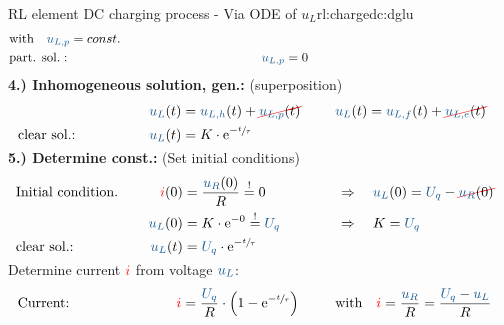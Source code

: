 {\begin{expl}{RL element DC charging process - Via ODE of $u_L$}{rl:chargedc:dglu}
\begin{align*}
                &\text{with}\quad \ecv{u_{L,p}} = const.  \\
        &\text{part. sol.}:&&&
            \ecv{u_{L,p}} &= 0
            \\[-15pt]&\hphantom{R1ooooooo}&&&\hphantom{L3oooooooooooooooooooo}&\hphantom{R3ooo}&&&&\hphantom{R5oooooooooooooooooooooo}\nonumber%
        \end{align*}%
    \textbf{4.) Inhomogeneous solution, gen.:} (superposition)%
    \begin{align*}%
        &&&&
            \ecv{u_L}(t) &= \ecv{u_{L,h}}(t) + \redcancel{\ecv{u_{L,p}}(t)} &&&
            &\ecv{u_L}(t)= \ecv{u_{L,f}}(t) + \redcancel{\ecv{u_{L,e}}(t)}  \\
        &\text{clear sol.:}&&&
            \ecv{u_L}(t) &= K \cdot \mathrm{e}^{-\sfrac{t}{\tau}}
        \\[-15pt]&\hphantom{R1oooooooooooo}&&&\hphantom{L3ooo}&\hphantom{R3oooooooooooooooo}&&&&\hphantom{R5oooooooooooooooooooooo}\nonumber%
    \end{align*}%
    \textbf{5.) Determine const.:} (Set initial conditions)%
    \begin{align*}%
        &\text{Initial condition.}&&&
            \eci{i}(0) &= \frac{\ecv{u_R}(0)}{R} \overset{!}{=} 0 &&&
            &\Rightarrow\quad \ecv{u_L}(0) = \ecv{U_q} - \redcancel{\ecv{u_R}(0)}\\
        &&&&
            \ecv{u_L}(0) &= K \cdot \mathrm{e}^{-0} \overset{!}{=} \ecv{U_q} &&&
            &\Rightarrow\quad K = \ecv{U_q}\\
        &\text{clear sol.:}&&&
            \ecv{u_L}(t) &= \ecv{U_q} \cdot \mathrm{e}^{-\sfrac{t}{\tau}}
        \\[-15pt]&\hphantom{R1oooooooooooo}&&&\hphantom{L3ooo}&\hphantom{R3oooooooooooooooo}&&&&\hphantom{R5oooooooooooooooooooooo}\nonumber%
        \end{align*}%
    Determine current ${\color{red}i}$ from voltage $\ecv{u_L}$:%
    \begin{align*}%
        &\text{Current:}&&&
            \eci{i} &= \frac{\ecv{U_q}}{R} \cdot \left( 1 - \mathrm{e}^{-\sfrac{t}{\tau}} \right) &&&
            &\text{with}\quad \eci{i} = \frac{\ecv{u_R}}{R} = \frac{\ecv{U_q} - \ecv{u_L}}{R}
        \\[-15pt]&\hphantom{R1oooooooooooo}&&&\hphantom{L3ooo}&\hphantom{R3oooooooooooooooo}&&&&\hphantom{R5oooooooooooooooooooooo}\nonumber%
    \end{align*}
    \endgroup
\end{expl}
}%

